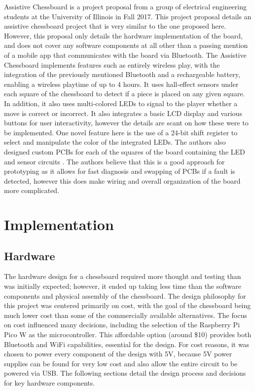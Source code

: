 \documentclass[11pt,journal]{IEEEtran}
\begin{document}
Assistive Chessboard is a project proposal from a group of electrical engineering students at the University of Illinois in Fall 2017. This project proposal details an assistive chessboard project that is very similar to the one proposed here. However, this proposal only details the hardware implementation of the board, and does not cover any software components at all other than a passing mention of a mobile app that communicates with the board via Bluetooth. The Assistive Chessboard implements features such as entirely wireless play, with the integration of the previously mentioned Bluetooth and a rechargeable battery, enabling a wireless playtime of up to 4 hours. It uses hall-effect sensors under each square of the chessboard to detect if a piece is placed on any given square. In addition, it also uses multi-colored LEDs to signal to the player whether a move is correct or incorrect. It also integrates a basic LCD display and various buttons for user interactivity, however the details are scant on how these were to be implemented. One novel feature here is the use of a 24-bit shift register to select and manipulate the color of the integrated LEDs. The authors also designed custom PCBs for each of the squares of the board containing the LED and sensor circuits \cite{assistivechess}. The authors believe that this is a good approach for prototyping as it allows for fast diagnosis and swapping of PCBs if a fault is detected, however this does make wiring and overall organization of the board more complicated.




\section{Implementation}
\subsection{Hardware}
The hardware design for a chessboard required more thought and testing than was initially expected; however, it ended up taking less time than the software components and physical assembly of the chessboard. The design philosophy for this project was centered primarily on cost, with the goal of the chessboard being much lower cost than some of the commercially available alternatives. The focus on cost influenced many decisions, including the selection of the Raspberry Pi Pico W as the microcontroller. This affordable option (around \$10) provides both Bluetooth and WiFi capabilities, essential for the design. For cost reasons, it was chosen to power every component of the design with 5V, because 5V power supplies can be found for very low cost and also allow the entire circuit to be powered via USB. The following sections detail the design process and decisions for key hardware components.
\end{document}
